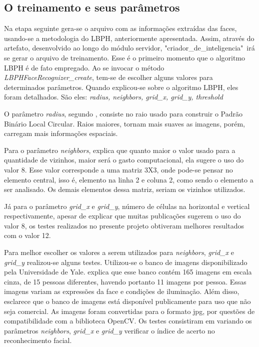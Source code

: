 \subsection{O treinamento e seus parâmetros}
\noindent
Na etapa seguinte gera-se o arquivo com as informações extraídas das faces, usando-se a metodologia do LBPH, anteriormente apresentada. Assim, através do artefato, desenvolvido ao longo do módulo servidor, "criador\_de\_inteligencia"\ irá se gerar o arquivo de treinamento. Esse é o primeiro momento que o algoritmo LBPH é de fato empregado. Ao se invocar o método \textit{LBPHFaceRecognizer\_create}, tem-se de escolher alguns valores para determinados parâmetros. Quando explicou-se sobre o algoritmo LBPH, eles foram detalhados. São eles:
\textit{radius, neighbors, grid\_x, grid\_y, threshold} 

O parâmetro \textit{radius}, segundo \citep{openlbph2018}, consiste no raio usado para construir o Padrão Binário Local Circular. Raios maiores, tornam mais suaves as imagens, porém, carregam mais informações espaciais. 

Para o parâmetro \textit{neighbors}, \citep{openlbph2018} explica que quanto maior o valor usado para a quantidade de vizinhos, maior será o gasto computacional, ela sugere o uso do valor 8. Esse valor corresponde a uma matriz 3X3, onde pode-se pensar no elemento central, isso é, elemento na linha 2 e coluna 2, como sendo o elemento a ser analisado. Os demais elementos dessa matriz, seriam os vizinhos utilizados. 

Já para o parâmetro \textit{grid\_x} e \textit{grid\_y}, número de células na horizontal e vertical respectivamente, apesar de \citep{openlbph2018} explicar que muitas publicações sugerem o uso do valor 8, os testes realizados no presente projeto obtiveram melhores resultados com o valor 12.

Para melhor escolher os valores a serem utilizados para \textit{neighbors}, \textit{grid\_x} e \textit{grid\_y} realizou-se alguns testes. Utilizou-se o banco de imagens disponibilizado pela Universidade de Yale. \citep{yales} explica que esse banco contém 165 imagens em escala cinza, de 15 pessoas diferentes, havendo portanto 11 imagens por pessoa. Essas imagens variam as expressões da face e condições de iluminação. Além disso, \citep{yales} esclarece que o banco de imagens está disponível publicamente para uso que não seja comercial. As imagens foram convertidas para o formato jpg, por questões de compatibilidade com a biblioteca OpenCV. Os testes consistiram em variando os parâmetros \textit{neighbors}, \textit{grid\_x} e \textit{grid\_y} verificar o índice de acerto no reconhecimento facial. 

